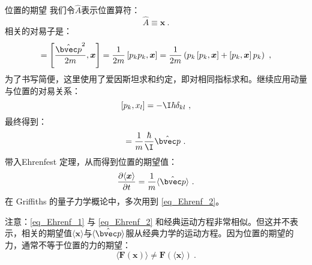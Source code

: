 \begin{example}{位置的期望}
我们令$\hat A$表示位置算符：
\begin{equation}
\hat A \equiv \boldsymbol{x}~.
\end{equation}
相关的对易子是：
\begin{equation}
[\hat H, \boldsymbol{x}]=\left[\frac{\hat{\bvec p}^2}{2 m}, \boldsymbol{x}\right]=\frac{1}{2 m}\left[p_k p_k, \boldsymbol{x}\right]=\frac{1}{2 m}\left(p_k\left[p_k, \boldsymbol{x}\right]+\left[p_k, \boldsymbol{x}\right] p_k\right)~,
\end{equation}
为了书写简便，这里使用了爱因斯坦求和约定，即对相同指标求和。继续应用动量与位置的对易关系：
\begin{equation}
\left[p_k, x_l\right]=-\I \hbar \delta_{k l}~,
\end{equation}
最终得到：
\begin{equation}
[\hat H, \boldsymbol{x}]=\frac{1}{m} \frac{\hbar}{\I} \hat{\bvec p}~.
\end{equation}
带入Ehrenfest 定理，从而得到位置的期望值：
\begin{equation}\label{eq_Ehrenf_2}
\frac{\partial\langle\boldsymbol{x}\rangle}{\partial t}=\frac{1}{m}\langle\hat{\bvec p}\rangle ~.
\end{equation}
在 Griffiths 的量子力学概论\cite{GriffQ}中，多次用到 \autoref{eq_Ehrenf_2}。
\end{example}

注意：\autoref{eq_Ehrenf_1} 与 \autoref{eq_Ehrenf_2} 和经典运动方程非常相似。但这并不表示，相关的期望值$\langle\boldsymbol{x}\rangle$与$\langle\hat{\bvec p}\rangle$服从经典力学的运动方程。因为位置的期望的力，通常不等于位置的力的期望：
\begin{equation}
\langle\boldsymbol{F}(\boldsymbol{x})\rangle \ne \boldsymbol{F}(\langle\boldsymbol{x}\rangle)~.
\end{equation}